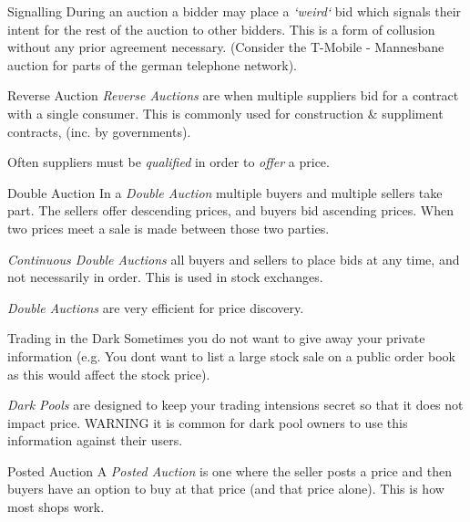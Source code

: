 \documentclass[11pt,a4paper]{article}
\begin{document}
  \begin{definition}{Signalling}
    During an auction a bidder may place a \textit{`weird`} bid which signals their intent for the rest of the auction to other bidders. This is a form of collusion without any prior agreement necessary. (Consider the T-Mobile - Mannesbane auction for parts of the german telephone network).
  \end{definition}

  \begin{definition}{Reverse Auction}
    \textit{Reverse Auctions} are when multiple suppliers bid for a contract with a single consumer. This is commonly used for construction \& suppliment contracts, (inc. by governments).
    \par Often suppliers must be \textit{qualified} in order to \textit{offer} a price.
  \end{definition}

  \begin{definition}{Double Auction}
    In a \textit{Double Auction} multiple buyers and multiple sellers take part. The sellers offer descending prices, and buyers bid ascending prices. When two prices meet a sale is made between those two parties.
    \par \textit{Continuous Double Auctions} all buyers and sellers to place bids at any time, and not necessarily in order. This is used in stock exchanges.
    \par \textit{Double Auctions} are very efficient for price discovery.
  \end{definition}

  \begin{proposition}{Trading in the Dark}
    Sometimes you do not want to give away your private information (e.g. You dont want to list a large stock sale on a public order book as this would affect the stock price).
    \par \textit{Dark Pools} are designed to keep your trading intensions secret so that it does not impact price. WARNING it is common for dark pool owners to use this information against their users.
  \end{proposition}

  \begin{definition}{Posted Auction}
    A \textit{Posted Auction} is one where the seller posts a price and then buyers have an option to buy at that price (and that price alone). This is how most shops work.
  \end{definition}
\end{document}
